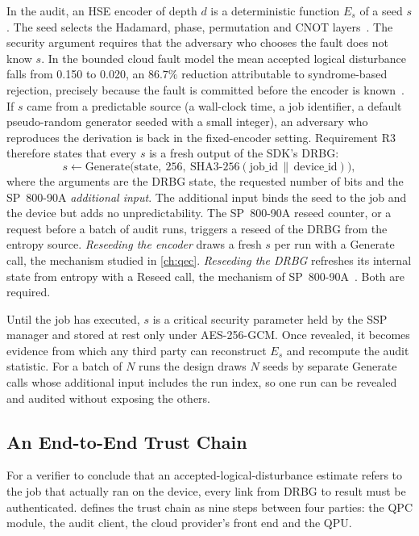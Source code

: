 In the audit, an HSE encoder of depth $d$ is a deterministic function $E_s$ of a seed $s$. The seed selects the Hadamard, phase, permutation and CNOT layers~\cite{guo2026qecaudit}. The security argument requires that the adversary who chooses the fault does not know $s$. In the bounded cloud fault model the mean accepted logical disturbance falls from 0.150 to 0.020, an $86.7\%$ reduction attributable to syndrome-based rejection, precisely because the fault is committed before the encoder is known~\cite{guo2026qecaudit}. If $s$ came from a predictable source (a wall-clock time, a job identifier, a default pseudo-random generator seeded with a small integer), an adversary who reproduces the derivation is back in the fixed-encoder setting. Requirement R3 therefore states that every $s$ is a fresh output of the SDK's DRBG:
\begin{equation}\label{eq:pqc:seed}
s \leftarrow \mathrm{Generate}\bigl(\mathrm{state},\ 256,\ \mathrm{SHA3\text{-}256}(\mathrm{job\_id} \,\|\, \mathrm{device\_id})\bigr),
\end{equation}
where the arguments are the DRBG state, the requested number of bits and the SP~800-90A \emph{additional input}. The additional input binds the seed to the job and the device but adds no unpredictability. The SP~800-90A reseed counter, or a request before a batch of audit runs, triggers a reseed of the DRBG from the entropy source. \emph{Reseeding the encoder} draws a fresh $s$ per run with a Generate call, the mechanism studied in \cref{ch:qec}. \emph{Reseeding the DRBG} refreshes its internal state from entropy with a Reseed call, the mechanism of SP~800-90A~\cite{nist2015sp80090a}. Both are required.

Until the job has executed, $s$ is a critical security parameter held by the SSP manager and stored at rest only under AES-256-GCM. Once revealed, it becomes evidence from which any third party can reconstruct $E_s$ and recompute the audit statistic. For a batch of $N$ runs the design draws $N$ seeds by separate Generate calls whose additional input includes the run index, so one run can be revealed and audited without exposing the others.

\subsection{An End-to-End Trust Chain}\label{sec:pqc:trustchain}

For a verifier to conclude that an accepted-logical-disturbance estimate refers to the job that actually ran on the device, every link from DRBG to result must be authenticated.  defines the trust chain as nine steps between four parties: the QPC module, the audit client, the cloud provider's front end and the QPU.

